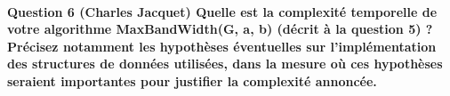 \documentclass[a4paper]{article}
\begin{document}
\paragraph{Question 6 (Charles Jacquet) Quelle est la complexité temporelle de votre algorithme MaxBandWidth(G, a, b) (décrit à la question 5) ? Précisez notamment les hypothèses éventuelles sur l’implémentation des structures de données utilisées, dans la mesure où ces hypothèses seraient importantes pour justifier la complexité annoncée.}
\end{document}

